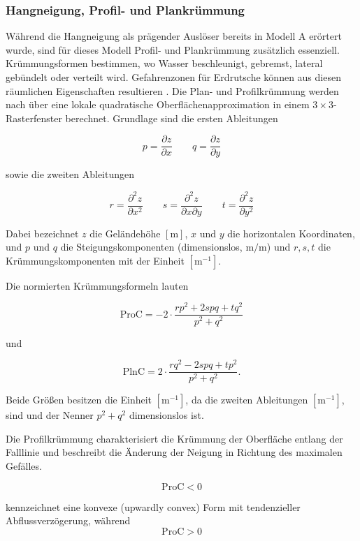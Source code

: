 \documentclass[../main.tex]{subfiles}
\begin{document}
\subsubsection{Hangneigung, Profil- und Plankrümmung}

Während die Hangneigung als prägender Auslöser bereits in Modell A
erörtert wurde, sind für dieses Modell Profil- und Plankrümmung zusätzlich essenziell.
Krümmungsformen bestimmen, wo Wasser beschleunigt, gebremst, lateral gebündelt oder verteilt wird. Gefahrenzonen für Erdrutsche können aus diesen räumlichen Eigenschaften resultieren \autocite{ohlmacherPlanCurvatureLandslide2007}.
Die Plan- und Profilkrümmung werden nach \textcite{zevenbergenQuantitativeAnalysisLand1987} über eine lokale quadratische Oberflächenapproximation in einem $3 \times 3$-Rasterfenster berechnet.
Grundlage sind die ersten Ableitungen


\[
    p = \frac{\partial z}{\partial x}\qquad
    q = \frac{\partial z}{\partial y}
\]


sowie die zweiten Ableitungen



\[
    r = \frac{\partial^2 z}{\partial x^2} \qquad
    s = \frac{\partial^2 z}{\partial x \partial y} \qquad
    t = \frac{\partial^2 z}{\partial y^2}
\]


Dabei bezeichnet \( z \) die Geländehöhe  \([\mathrm{m}]\),  \( x \) und \( y \) die horizontalen Koordinaten, und  \( p \) und \( q \)  die Steigungskomponenten (dimensionslos, \(\mathrm{m/m}\))  und \( r, s, t \)  die Krümmungskomponenten mit der Einheit \([\mathrm{m^{-1}}]\).


Die normierten Krümmungsformeln lauten


\[
    \mathrm{ProC} =
    -2 \cdot
    \frac{r p^2 + 2 s p q + t q^2}{p^2 + q^2}
\]

und

\[
    \mathrm{PlnC} =
    2 \cdot
    \frac{r q^2 - 2 s p q + t p^2}{p^2 + q^2}.
\]

Beide Größen besitzen die Einheit \([\mathrm{m^{-1}}]\), da die zweiten Ableitungen \([\mathrm{m^{-1}}]\), sind und der Nenner  \( p^2 + q^2 \)  dimensionslos ist.


Die Profilkrümmung charakterisiert die Krümmung der Oberfläche entlang der Falllinie und beschreibt die Änderung der Neigung in Richtung des maximalen Gefälles.

\[
    \mathrm{ProC} < 0
\]

kennzeichnet eine konvexe (upwardly convex) Form mit tendenzieller Abflussverzögerung, während
\[
    \mathrm{ProC} > 0
\]
\end{document}
